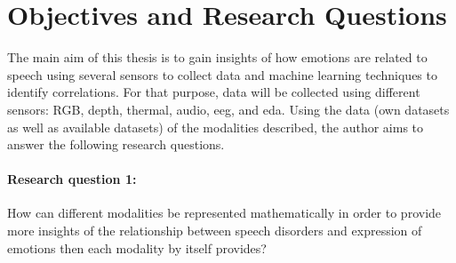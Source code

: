 \begin{comment}
The same setting could also be applied to patients with facial paralysis, caused by nerve damage. It usually occurs on only one side of the face and can have different degrees of severity which cause difficulty not only in speaking but also in eating and drinking. Although there are more than twenty grading methods of the severity of facial paralysis, they have defaults in integration, feasibility, accuracy, and reliability \cite{Dong2008}. The development of an accurate method for detection and grading of facial paralysis based on image processing would be beneficial to clinicians and patients.


For both, speech therapy and facial paralysis therapy, treatment takes several months of therapy sessions in which various exercises are performed to improve weakness in oral musculature. The video monitoring during therapy combined with the analysis of face muscle performance could help therapists to follow up the progress of each patient, compare patients with similar problems and even provide therapists with quantitative measurements. The inclusion of affective computing in the face analysis system, would accquire additional information of the patient's degree of engagement during the exercises being an additional factor to a successful therapy. Through the use of different sources of data such as health records, a multimodal time series of observations is used to develop a clinical decision support system that supports therapists in providing personalized therapies.

\end{comment}


\section{Objectives and Research Questions}

The main aim of this thesis is to gain insights of how emotions are related to speech using several sensors to collect data and machine learning techniques to identify correlations. For that purpose, data will be collected using different sensors: RGB, depth, thermal, audio, \gls{eeg}, and \gls{eda}. Using the data (own datasets as well as available datasets) of the modalities described, the author aims to answer the following research questions.

\paragraph{Research question 1:} How can different modalities be represented mathematically in order to provide more insights of the relationship between speech disorders and expression of emotions then each modality by itself provides?

